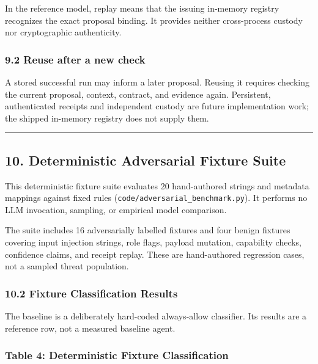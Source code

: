 \documentclass[
  10pt,
]{article}
\begin{document}
In the reference model, replay means that the issuing in-memory registry recognizes the exact proposal binding. It provides neither cross-process custody nor cryptographic authenticity.

\subsubsection{9.2 Reuse after a new check}\label{reuse-after-a-new-check}

A stored successful run may inform a later proposal. Reusing it requires checking the current proposal, context, contract, and evidence again. Persistent, authenticated receipts and independent custody are future implementation work; the shipped in-memory registry does not supply them.

\begin{center}\rule{0.5\linewidth}{0.5pt}\end{center}

\subsection{10. Deterministic Adversarial Fixture Suite}\label{deterministic-adversarial-fixture-suite}

This deterministic fixture suite evaluates 20 hand-authored strings and metadata mappings against fixed rules (\texttt{code/adversarial\_benchmark.py}). It performs no LLM invocation, sampling, or empirical model comparison.

The suite includes 16 adversarially labelled fixtures and four benign fixtures covering input injection strings, role flags, payload mutation, capability checks, confidence claims, and receipt replay. These are hand-authored regression cases, not a sampled threat population.

\subsubsection{10.2 Fixture Classification Results}\label{fixture-classification-results}

The baseline is a deliberately hard-coded always-allow classifier. Its results are a reference row, not a measured baseline agent.

\subsubsection{Table 4: Deterministic Fixture Classification}\label{table-4-deterministic-fixture-classification}
\end{document}
